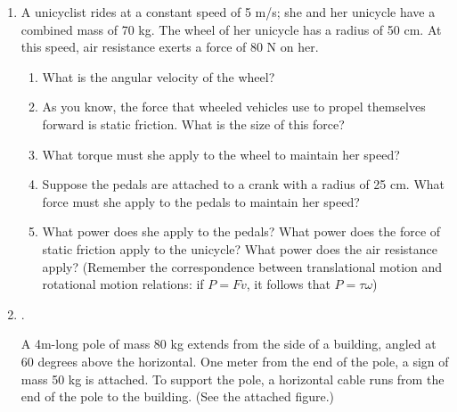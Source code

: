 \documentclass[12pt]{article}
\begin{document}
\Large
\centerline{}
\normalsize
\centerline{}
\small

\medskip

\begin{enumerate}

\item A unicyclist rides at a constant speed of 5 m/s; she and her unicycle have a combined mass of 70 kg. The wheel of her unicycle has a radius of 50 cm. At this speed, air resistance exerts a force of 80 N on her.

\begin{enumerate}
       \item What is the angular velocity of the wheel? 
\vspace{1.2in}

       \item As you know, the force that wheeled vehicles use to propel themselves forward is static friction. What is the size of this force?
\vspace {1.2in}

       \item What torque must she apply to the wheel to maintain her speed?
\vspace{2in}

\newpage
       \item Suppose the pedals are attached to a crank with a radius of 25 cm. What force must she apply to the pedals to maintain her speed?
\vspace{3in}

       \item What power does she apply to the pedals? What power does the force of static friction apply to the unicycle? What power does the air resistance apply? (Remember the correspondence between translational motion and 
rotational motion relations: if $P=Fv$, it follows that $P=\tau \omega$)
\end{enumerate}
 \newpage

\item .

\begin{minipage}[b]{0.4\textwidth}
  \vspace{-2.8in}

A 4m-long pole of mass 80 kg extends from the side of a building, angled at 60 degrees above the horizontal. One meter from the end of the pole, a sign of mass 50 kg is attached. To support the pole,
a horizontal cable runs from the end of the pole to the building. (See the attached figure.)


\end{minipage}
\end{enumerate}
\end{document}
